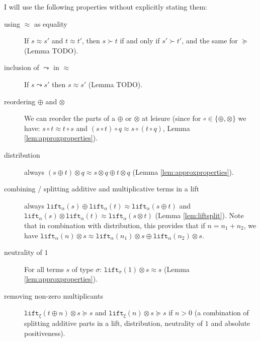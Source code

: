 \documentclass[runningheads,a4paper]{llncs}
\newcommand{\lift}{\mathtt{lift}}
\begin{document}
I will use the following properties without explicitly stating them:
\begin{description}
\item[using $\approx$ as equality]
  If $s \approx s'$ and $t \approx t'$, then $s \succ t$ if and
  only if $s' \succ t'$, and the same for $\succeq$ (Lemma TODO).
\item[inclusion of $\leadsto$ in $\approx$]
  If $s \leadsto s'$ then $s \approx s'$ (Lemma TODO).
\item[reordering $\oplus$ and $\otimes$]
  We can reorder the parts of a $\oplus$ or $\otimes$ at leisure
  (since for $\circ \in \{\oplus,\otimes\}$ we have:
  $s \circ t \approx t \circ s$ and $(s \circ t) \circ q \approx
  s \circ (t \circ q)$, Lemma \ref{lem:approxproperties}).
\item[distribution] always $(s \oplus t) \otimes q
  \approx s \otimes q \oplus t \otimes q$ (Lemma
  \ref{lem:approxproperties}).
\item[combining / splitting additive and multiplicative terms in a
  lift] always
  $\lift_\alpha(s) \oplus \lift_\alpha(t) \approx \lift_\alpha(s
  \oplus t)$ and
  $\lift_\alpha(s) \otimes \lift_\alpha(t) \approx \lift_\alpha(s
  \otimes t)$ (Lemma \ref{lem:liftsplit}).
  Note that in combination with distribution, this provides that
  if $n = n_1 + n_2$, we have $\lift_\alpha(n) \otimes s \approx
  \lift_\alpha(n_1) \otimes s \oplus \lift_\alpha(n_2) \otimes s$.
\item[neutrality of $1$] For all terms $s$ of type $\sigma$:
  $\lift_\sigma(1) \otimes s \approx s$ (Lemma
  \ref{lem:approxproperties}).
\item[removing non-zero multiplicants]
  $\lift_\xi(t \oplus n) \otimes s \succeq s$ and
  $\lift_\xi(n) \otimes s \succeq s$ if $n > 0$
  (a combination of splitting additive parts in a lift, distribution,
  neutrality of $1$ and absolute positiveness).
\end{description}
\end{document}
